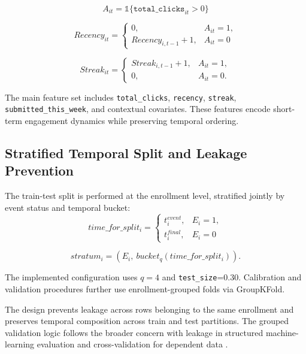 \begin{equation*}
A_{it}=\mathbb{1}\{\texttt{total\_clicks}_{it}>0\}
\end{equation*}

\begin{equation*}
Recency_{it}=\begin{cases}
0, & A_{it}=1, \\
Recency_{i,t-1}+1, & A_{it}=0
\end{cases}
\end{equation*}

\begin{equation*}
Streak_{it}=\begin{cases}
Streak_{i,t-1}+1, & A_{it}=1, \\
0, & A_{it}=0.
\end{cases}
\end{equation*}

The main feature set includes \texttt{total\_clicks}, \texttt{recency}, \texttt{streak}, \texttt{submitted\_this\_week}, and contextual covariates. These features encode short-term engagement dynamics while preserving temporal ordering.

\subsection{Stratified Temporal Split and Leakage Prevention}

The train-test split is performed at the enrollment level, stratified jointly by event status and temporal bucket:
\begin{equation*}
time\_for\_split_i=\begin{cases}
t_i^{event}, & E_i=1, \\
t_i^{final}, & E_i=0
\end{cases}
\end{equation*}

\begin{equation*}
stratum_i=(E_i,\ bucket_q(time\_for\_split_i)).
\end{equation*}

The implemented configuration uses $q=4$ and \texttt{test\_size}=0.30. Calibration and validation procedures further use enrollment-grouped folds via GroupKFold.

The design prevents leakage across rows belonging to the same enrollment and preserves temporal composition across train and test partitions. The grouped validation logic follows the broader concern with leakage in structured machine-learning evaluation and cross-validation for dependent data \cite{KapoorNarayanan2023LeakagePatterns,RobertsEtAl2017CrossValidationEcography}.

